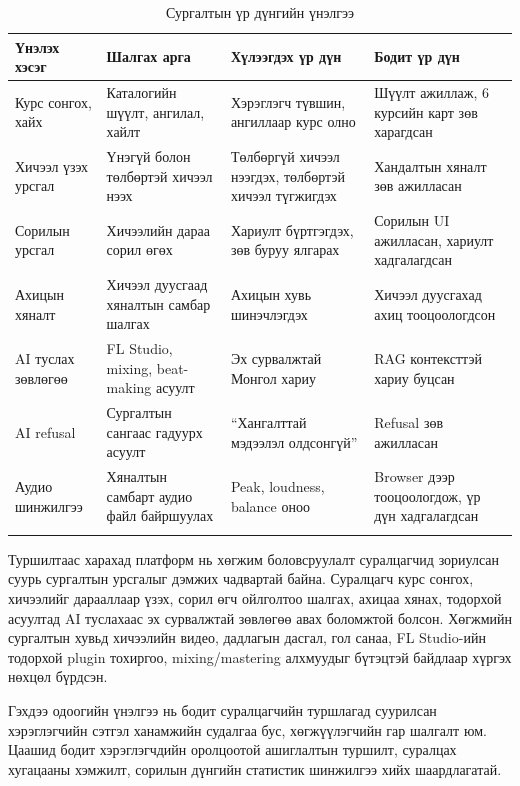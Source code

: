 \begin{longtable}{|p{}|p{}|p{}|p{}|}
  \hline
  \textbf{Үнэлэх хэсэг} & \textbf{Шалгах арга} & \textbf{Хүлээгдэх үр дүн} & \textbf{Бодит үр дүн} \\ \hline
  Курс сонгох, хайх & Каталогийн шүүлт, ангилал, хайлт & Хэрэглэгч түвшин, ангиллаар курс олно & Шүүлт ажиллаж, 6 курсийн карт зөв харагдсан \\ \hline
  Хичээл үзэх урсгал & Үнэгүй болон төлбөртэй хичээл нээх & Төлбөргүй хичээл нээгдэх, төлбөртэй хичээл түгжигдэх & Хандалтын хяналт зөв ажилласан \\ \hline
  Сорилын урсгал & Хичээлийн дараа сорил өгөх & Хариулт бүртгэгдэх, зөв буруу ялгарах & Сорилын UI ажилласан, хариулт хадгалагдсан \\ \hline
  Ахицын хяналт & Хичээл дуусгаад хяналтын самбар шалгах & Ахицын хувь шинэчлэгдэх & Хичээл дуусгахад ахиц тооцоологдсон \\ \hline
  AI туслах зөвлөгөө & FL Studio, mixing, beat-making асуулт & Эх сурвалжтай Монгол хариу & RAG контексттэй хариу буцсан \\ \hline
  AI refusal & Сургалтын сангаас гадуурх асуулт & ``Хангалттай мэдээлэл олдсонгүй'' & Refusal зөв ажилласан \\ \hline
  Аудио шинжилгээ & Хяналтын самбарт аудио файл байршуулах & Peak, loudness, balance оноо & Browser дээр тооцоологдож, үр дүн хадгалагдсан \\ \hline
  \caption{Сургалтын үр дүнгийн үнэлгээ}
  \label{tab:ch4-training-results}
\end{longtable}

Туршилтаас харахад платформ нь хөгжим боловсруулалт суралцагчид зориулсан суурь сургалтын урсгалыг дэмжих чадвартай байна. Суралцагч курс сонгох, хичээлийг дарааллаар үзэх, сорил өгч ойлголтоо шалгах, ахицаа хянах, тодорхой асуултад AI туслахаас эх сурвалжтай зөвлөгөө авах боломжтой болсон. Хөгжмийн сургалтын хувьд хичээлийн видео, дадлагын дасгал, гол санаа, FL Studio-ийн тодорхой plugin тохиргоо, mixing/mastering алхмуудыг бүтэцтэй байдлаар хүргэх нөхцөл бүрдсэн.

Гэхдээ одоогийн үнэлгээ нь бодит суралцагчийн туршлагад суурилсан хэрэглэгчийн сэтгэл ханамжийн судалгаа бус, хөгжүүлэгчийн гар шалгалт юм. Цаашид бодит хэрэглэгчдийн оролцоотой ашиглалтын туршилт, суралцах хугацааны хэмжилт, сорилын дүнгийн статистик шинжилгээ хийх шаардлагатай.

